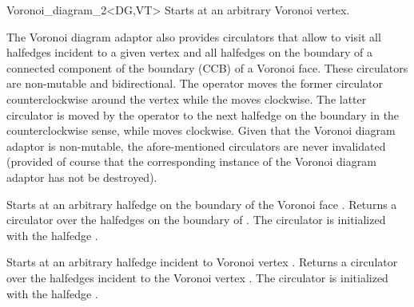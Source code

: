\begin{ccRefClass}{Voronoi_diagram_2<DG,VT>}
{Starts at an arbitrary Voronoi vertex.}
\ccGlue
{}





The Voronoi diagram adaptor also provides circulators that allow to visit 
all halfedges incident to a given vertex and all halfedges
on the boundary of a connected component of the boundary (CCB) of a
Voronoi face. These circulators are non-mutable and bidirectional.
The operator  moves the former circulator counterclockwise
around the vertex while the  moves clockwise.
The latter circulator is moved by the operator  to the
next halfedge on the boundary in the counterclockwise sense, while
 moves clockwise.
Given that the Voronoi diagram adaptor is non-mutable, the
afore-mentioned circulators are never invalidated (provided of course
that the corresponding instance of the Voronoi diagram adaptor has not
be destroyed).

\ccThreeToTwo
%
{Starts at an arbitrary halfedge on the boundary of the Voronoi face
  .}
\ccGlue
{} 
{Returns a circulator over the halfedges on the boundary of
  . The circulator is initialized with the halfedge .
  }

\ccThreeToTwo
%
{Starts at an arbitrary halfedge incident to Voronoi vertex .}
\ccGlue
{}
{Returns a circulator over the halfedges incident to the Voronoi
  vertex . The circulator is initialized with the halfedge
  .
  }


\begin{ccTexOnly}
\newpage
\end{ccTexOnly}



\end{ccRefClass}
